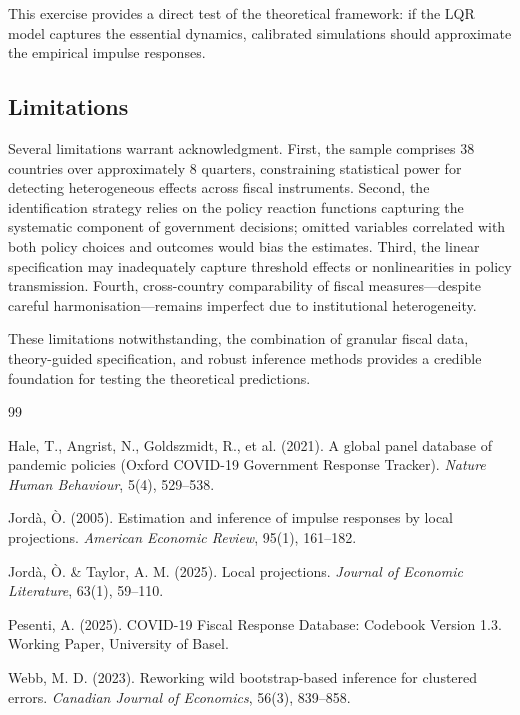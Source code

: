 \documentclass[12pt, a4paper]{article}
\begin{document}
This exercise provides a direct test of the theoretical framework: if the LQR model captures the essential dynamics, calibrated simulations should approximate the empirical impulse responses.

\subsection{Limitations}

Several limitations warrant acknowledgment. First, the sample comprises 38 countries over approximately 8 quarters, constraining statistical power for detecting heterogeneous effects across fiscal instruments. Second, the identification strategy relies on the policy reaction functions capturing the systematic component of government decisions; omitted variables correlated with both policy choices and outcomes would bias the estimates. Third, the linear specification may inadequately capture threshold effects or nonlinearities in policy transmission. Fourth, cross-country comparability of fiscal measures—despite careful harmonisation—remains imperfect due to institutional heterogeneity.

These limitations notwithstanding, the combination of granular fiscal data, theory-guided specification, and robust inference methods provides a credible foundation for testing the theoretical predictions.


\begin{thebibliography}{99}

Hale, T., Angrist, N., Goldszmidt, R., et al. (2021).
\newblock A global panel database of pandemic policies (Oxford COVID-19 Government Response Tracker).
\newblock \textit{Nature Human Behaviour}, 5(4), 529--538.

Jordà, Ò. (2005).
\newblock Estimation and inference of impulse responses by local projections.
\newblock \textit{American Economic Review}, 95(1), 161--182.

Jordà, Ò. \& Taylor, A. M. (2025).
\newblock Local projections.
\newblock \textit{Journal of Economic Literature}, 63(1), 59--110.

Pesenti, A. (2025).
\newblock COVID-19 Fiscal Response Database: Codebook Version 1.3.
\newblock Working Paper, University of Basel.

Webb, M. D. (2023).
\newblock Reworking wild bootstrap-based inference for clustered errors.
\newblock \textit{Canadian Journal of Economics}, 56(3), 839--858.

\end{thebibliography}
\end{document}
